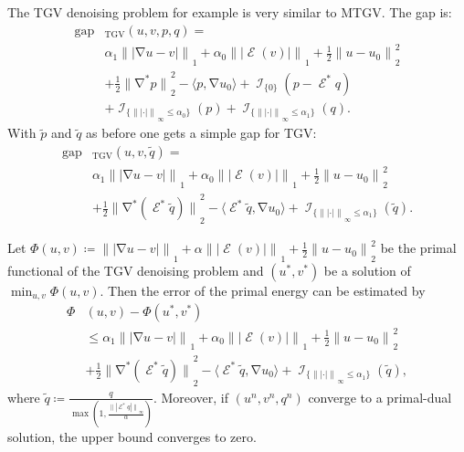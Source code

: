 \documentclass[twocolumn,envcountsame]{svjour3}
\newcommand{\norm}[2][]{{\|{#2}\|_{}}_{#1}}
\newcommand{\abs}[1]{|#1|}
\DeclareMathOperator{\ind}{\mathcal{I}}
\DeclareMathOperator{\gap}{gap}
\DeclareMathOperator{\grad}{\nabla}
\DeclareMathOperator{\symgrad}{\mathcal{E}}
\begin{document}
 
  The TGV denoising problem for example is very similar to MTGV. The gap is:
   \begin{align*}
     \gap&_{\operatorname{TGV}}(u,v,p,q)=\\
   &\alpha_1\norm[1]{\abs{\grad u - v}} + 
		\alpha_0\norm[1]{\abs{\symgrad(v)}}
		+\frac{1}{2}\norm[2]{u-u_0}^2\\
		&+\frac{1}{2}\norm[2]{\grad^* p}^2 - \langle p, \grad u_0\rangle 
		+\ind_{\{0\}}(p - \symgrad^*q) \\
		&+\ind_{\{\norm[\infty]{\abs{\cdot}}\leq\alpha_0\}}(p) +
		\ind_{\{\norm[\infty]{\abs{\cdot}}\leq\alpha_1\}}(q).
     \end{align*}
     With $\tilde p$ and $\tilde q$ as before one gets a simple gap for TGV:
   \begin{align*}
     \gap&_{\operatorname{TGV}}(u,v,\tilde q)=\\
           &\alpha_1\norm[1]{\abs{\grad u - v}} + 
		\alpha_0\norm[1]{\abs{\symgrad(v)}}
		+\frac{1}{2}\norm[2]{u-u_0}^2\\
		&+\frac{1}{2}\norm[2]{\grad^* (\symgrad^*\tilde q)}^2 - \langle \symgrad^*\tilde q, \grad
		u_0\rangle + \ind_{\{\norm[\infty]{\abs{\cdot}}\leq\alpha_1\}}(\tilde q).
	      \end{align*}
 \begin{corollary}\label{le:gaptgv}
	Let $\Phi(u,v)\coloneqq\norm[1]{\abs{\grad u - v}} + 
		\alpha\norm[1]{\abs{\symgrad(v)}}
		+\frac{1}{2}\norm[2]{u-u_0}^2$ be the primal functional of the
		TGV denoising problem and $(u^*,v^*)$ be a solution of $\min_{u,v}\Phi(u,v)$. Then the
		error of the primal energy can be estimated by
		\begin{equation*}
		  \begin{split}
		  \Phi&(u,v)-\Phi(u^*,v^*)\\
		  &\leq 
	  \alpha_1\norm[1]{\abs{\grad u - v}} + 
		\alpha_0\norm[1]{\abs{\symgrad(v)}}
		+\frac{1}{2}\norm[2]{u-u_0}^2\\
		&+\frac{1}{2}\norm[2]{\grad^* (\symgrad^*\tilde q)}^2 - \langle \symgrad^*\tilde q, \grad
		u_0\rangle + \ind_{\{\norm[\infty]{\abs{\cdot}}\leq\alpha_1\}}(\tilde q),
	      \end{split}
		\end{equation*}
		where $\tilde
		q\coloneqq\frac{q}{\max\left(1,\frac{\norm[\infty]{\abs{\symgrad^*q}}}{\alpha}\right)}$.
  Moreover, if $(u^{n},v^{n},q^{n})$ converge to a primal-dual solution, the upper bound converges to zero.
  \end{corollary}
\end{document}
